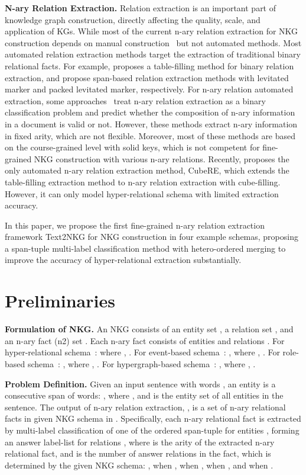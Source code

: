 \documentclass{article} \usepackage{iclr2024_conference,times}
\begin{document}
\textbf{N-ary Relation Extraction. }
Relation extraction is an important part of knowledge graph construction, directly affecting the quality, scale, and application of KGs. While most of the current n-ary relation extraction for NKG construction depends on manual construction~\citep{m-TransH,NaLP,StarE} but not automated methods. Most automated relation extraction methods target the extraction of traditional binary relational facts. For example, \cite{table-filling} proposes a table-filling method for binary relation extraction, and \cite{PURE,PL-Marker} propose span-based relation extraction methods with levitated marker and packed levitated marker, respectively. 
For n-ary relation automated extraction, some approaches~\citep{documentlevelNRE,Document2,Document3} treat n-ary relation extraction as a binary classification problem and predict whether the composition of n-ary information in a document is valid or not. However, these methods extract n-ary information in fixed arity, which are not flexible. Moreover, most of these methods are based on the course-grained level with solid keys, which is not competent for fine-grained NKG construction with various n-ary relations. Recently, \cite{HyperRED} proposes the only automated n-ary relation extraction method, CubeRE, which extends the table-filling extraction method to n-ary relation extraction with cube-filling. However, it can only model hyper-relational schema with limited extraction accuracy.

In this paper, we propose the first fine-grained n-ary relation extraction framework Text2NKG for NKG construction in four example schemas, proposing a span-tuple multi-label classification method with hetero-ordered merging to improve the accuracy of hyper-relational extraction substantially.



\section{Preliminaries}
\textbf{Formulation of NKG. } 
An NKG  consists of an entity set , a relation set , and an n-ary fact (n2) set . Each n-ary fact  consists of entities  and relations .
For hyper-relational schema~\citep{Hinge}:  where , .
For event-based schema~\citep{Text2Event}: , where , . 
For role-based schema~\citep{NaLP}: , where , .
For hypergraph-based schema~\citep{m-TransH}: , where , .






\textbf{Problem Definition. }
Given an input sentence with  words , an entity  is a consecutive span of words: , where , and  is the entity set of all  entities in the sentence. The output of n-ary relation extraction, , is a set of n-ary relational facts  in given NKG schema in . Specifically, each n-ary relational fact  is extracted by multi-label classification of one of the ordered span-tuple for  entities , forming an answer label-list for  relations , where  is the arity of the extracted n-ary relational fact, and  is the number of answer relations in the fact, which is determined by the given NKG schema: , when ,  when ,  when , and  when .
\end{document}
